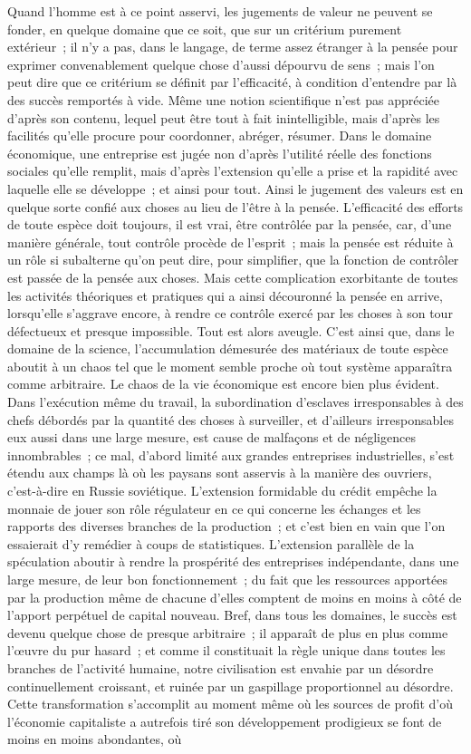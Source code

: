 \documentclass[french,twoside]{book} %
\begin{document}
Quand l'homme est à ce point asservi, les jugements de valeur ne peuvent se fonder, en quelque domaine que ce soit, que sur un critérium purement extérieur ; il n'y a pas, dans le langage, de terme assez étranger à la pensée pour exprimer convenablement quelque chose d'aussi dépourvu de sens ; mais l'on peut dire que ce critérium se définit par l'efficacité, à condition d'entendre par là des succès remportés à vide. Même une notion scientifique n'est pas appréciée d'après son contenu, lequel peut être tout à fait inintelligible, mais d'après les facilités qu'elle procure pour coordonner, abréger, résumer. Dans le domaine économique, une entreprise est jugée non d'après l'utilité réelle des fonctions sociales qu'elle remplit, mais d'après l’extension qu'elle a prise et la rapidité avec laquelle elle se développe ; et ainsi pour tout. Ainsi le jugement des valeurs est en quelque sorte confié aux choses au lieu de l'être à la pensée. L'efficacité des efforts de toute espèce doit toujours, il est vrai, être contrôlée par la pensée, car, d'une manière générale, tout contrôle procède de l'esprit ; mais la pensée est réduite à un rôle si subalterne qu'on peut dire, pour simplifier, que la fonction de contrôler est passée de la pensée aux choses. Mais cette complication exorbitante de toutes les activités théoriques et pratiques qui a ainsi découronné la pensée en arrive, lorsqu'elle s'aggrave encore, à rendre ce contrôle exercé par les choses à son tour défectueux et presque impossible. Tout est alors aveugle. C'est ainsi que, dans le domaine de la science, l'accumulation démesurée des matériaux de toute espèce aboutit à un chaos tel que le moment semble proche où tout système apparaîtra comme arbitraire. Le chaos de la vie économique est encore bien plus évident. Dans l'exécution même du travail, la subordination d'esclaves irresponsables à des chefs débordés par la quantité des choses à surveiller, et d'ailleurs irresponsables eux aussi dans une large mesure, est cause de malfaçons et de négligences innombrables ; ce mal, d'abord limité aux grandes entreprises industrielles, s'est étendu aux champs là où les paysans sont asservis à la manière des ouvriers, c'est-à-dire en Russie soviétique. L'extension formidable du crédit empêche la monnaie de jouer son rôle régulateur en ce qui concerne les échanges et les rapports des diverses branches de la production ; et c'est bien en vain que l'on essaierait d'y remédier à coups de statistiques. L'extension parallèle de la spéculation aboutir à rendre la prospérité des entreprises indépendante, dans une large mesure, de leur bon fonctionnement ; du fait que les ressources apportées par la production même de chacune d'elles comptent de moins en moins à côté de l'apport perpétuel de capital nouveau. Bref, dans tous les domaines, le succès est devenu quelque chose de presque arbitraire ; il apparaît de plus en plus comme l'œuvre du pur hasard ; et comme il constituait la règle unique dans toutes les branches de l'activité humaine, notre civilisation est envahie par un désordre continuellement croissant, et ruinée par un gaspillage proportionnel au désordre. Cette transformation s’accomplit au moment même où les sources de profit d'où l'économie capitaliste a autrefois tiré son développement prodigieux se font de moins en moins abondantes, où 
\end{document}
